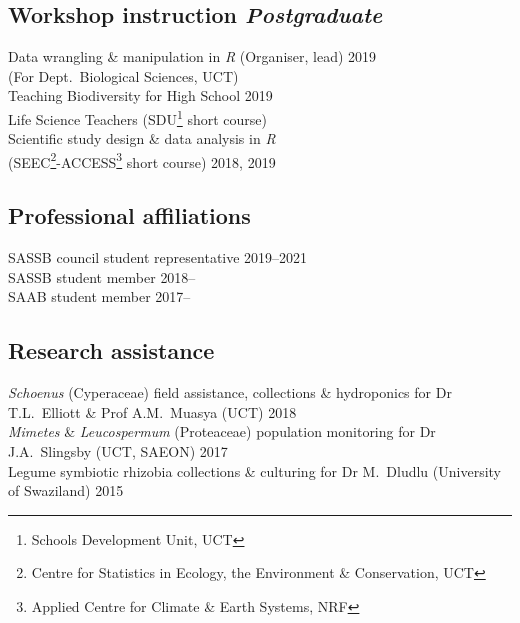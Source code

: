 \documentclass[10pt]{article}
\begin{document}
\begin{multicols}{2}
\subsection*{Workshop instruction %
                                 \hfill {\small \textmd{\textit{Postgraduate}}}}

Data wrangling \& manipulation in \textit{R}
  {\small (Organiser, lead)}                       \hfill {\small       2019} \\
  \hspace{2em} {\small (For Dept.~Biological Sciences, UCT)}                  \\
Teaching Biodiversity for High School              \hfill {\small       2019} \\
  \hspace{2em} Life Science Teachers {\small (SDU\footnote{
    Schools Development Unit, UCT} short course)}                             \\
Scientific study design \& data analysis in \textit{R}                        \\
  \hspace{2em} {\small(SEEC\footnote{Centre for Statistics in
  Ecology, the Environment \&
  Conservation, UCT}-ACCESS\footnote{Applied
  Centre for Climate \& Earth Systems, NRF}
  short course)}                                   \hfill {\small 2018, 2019}

\subsection*{Professional affiliations} %

SASSB council student representative   \hfill {\small 2019--2021            } \\
SASSB student member                   \hfill {\small 2018--\hspace*{2.25em}} \\
SAAB student member                    \hfill {\small 2017--\hspace*{2.25em}}

\end{multicols} %

\subsection*{Research assistance} %

\textit{Schoenus} (Cyperaceae)
field assistance, collections \& hydroponics
for Dr T.L.~Elliott \& Prof A.M.~Muasya
{\small (UCT)}                                         \hfill {\small 2018} \\
\textit{Mimetes} \& \textit{Leucospermum} (Proteaceae)
population monitoring
for Dr J.A.~Slingsby
{\small (UCT, SAEON)}                                  \hfill {\small 2017} \\
Legume symbiotic rhizobia
collections \& culturing
for Dr M.~Dludlu
{\small (University of Swaziland)}                     \hfill {\small 2015}
\end{document}
